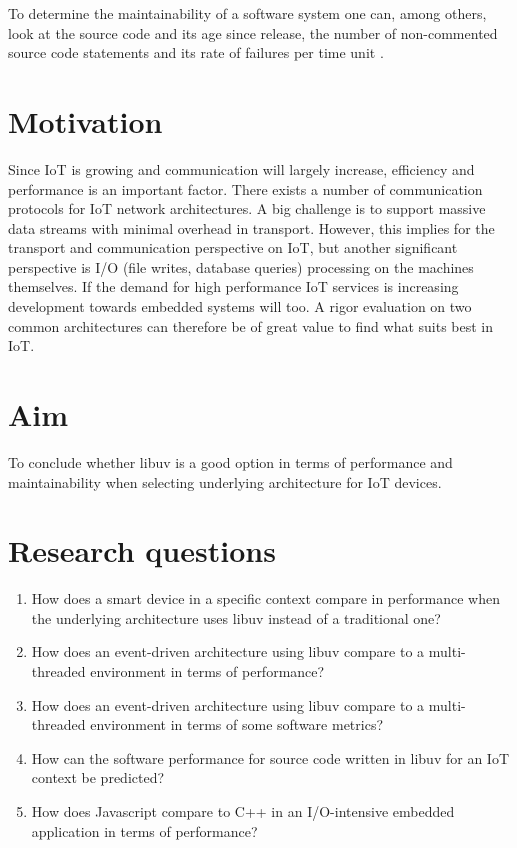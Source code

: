 To determine the maintainability of a software system one can, among others,
look at the source code and its age since release, the number of non-commented
source code statements and its rate of failures per time unit
\cite{oman1992metrics}.

\section{Motivation}
\label{sec:motivation}

Since IoT is growing and communication will largely increase, efficiency and
performance is an important factor. There exists a number of communication
protocols for IoT network architectures. A big challenge is to support massive
data streams with minimal overhead in transport. However, this implies for the
transport and communication perspective on IoT, but another significant
perspective is I/O (file writes, database queries) processing on the machines
themselves. If the demand for high performance IoT services is increasing
development towards embedded systems will too. A rigor evaluation on two common
architectures can therefore be of great value to find what suits best in IoT.

\section{Aim}
\label{sec:aim}

To conclude whether libuv is a good option in terms of performance and
maintainability when selecting underlying architecture for IoT devices.

\section{Research questions}
\label{sec:research-questions}

\begin{enumerate}
    \item How does a smart device in a specific context compare in performance
        when the underlying architecture uses libuv instead of a traditional
        one?

    \item How does an event-driven architecture using libuv compare to a
        multi-threaded environment in terms of performance?

    \item How does an event-driven architecture using libuv compare to a
        multi-threaded environment in terms of some software metrics?

    \item How can the software performance for source code written in libuv for
        an IoT context be predicted?

    \item How does Javascript compare to C++ in an I/O-intensive embedded
        application in terms of performance?
\end{enumerate}

